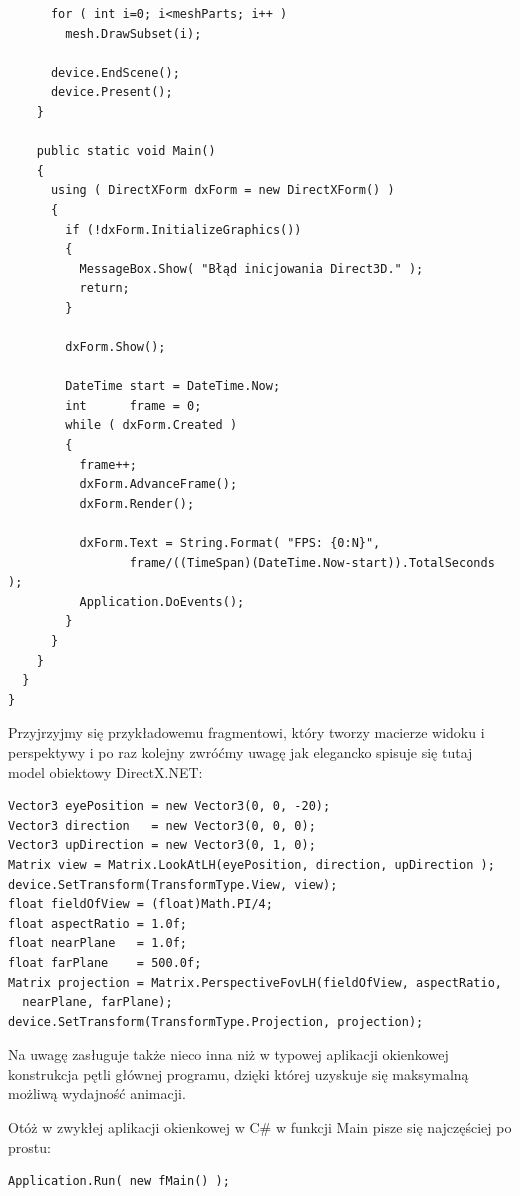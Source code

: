 \begin{scriptsize}
\begin{verbatim}
      for ( int i=0; i<meshParts; i++ )
        mesh.DrawSubset(i);

      device.EndScene();
      device.Present();
    }

    public static void Main() 
    {
      using ( DirectXForm dxForm = new DirectXForm() )
      {
        if (!dxForm.InitializeGraphics()) 
        {
          MessageBox.Show( "Błąd inicjowania Direct3D." );
          return;
        }
			
        dxForm.Show();

        DateTime start = DateTime.Now;
        int      frame = 0;
        while ( dxForm.Created )
        {
          frame++;
          dxForm.AdvanceFrame();
          dxForm.Render();

          dxForm.Text = String.Format( "FPS: {0:N}", 
	             frame/((TimeSpan)(DateTime.Now-start)).TotalSeconds );
          Application.DoEvents();
        }
      }
    }
  }
}
\end{verbatim}
\end{scriptsize}
 
Przyjrzyjmy się przykładowemu fragmentowi, który tworzy macierze widoku i perspektywy i po 
raz kolejny zwróćmy uwagę jak elegancko spisuje się tutaj model obiektowy DirectX.NET:

\begin{scriptsize}
\begin{verbatim}
Vector3 eyePosition = new Vector3(0, 0, -20);
Vector3 direction   = new Vector3(0, 0, 0);
Vector3 upDirection = new Vector3(0, 1, 0);
Matrix view = Matrix.LookAtLH(eyePosition, direction, upDirection );
device.SetTransform(TransformType.View, view);
float fieldOfView = (float)Math.PI/4;
float aspectRatio = 1.0f;
float nearPlane   = 1.0f;
float farPlane    = 500.0f;
Matrix projection = Matrix.PerspectiveFovLH(fieldOfView, aspectRatio, 
  nearPlane, farPlane);
device.SetTransform(TransformType.Projection, projection);
\end{verbatim}
\end{scriptsize}

Na uwagę zasługuje także nieco inna niż w typowej aplikacji okienkowej konstrukcja pętli głównej programu, 
dzięki której uzyskuje się maksymalną możliwą wydajność animacji. 

Otóż w zwykłej aplikacji okienkowej w C\# w funkcji Main pisze się najczęściej po prostu:

\begin{scriptsize}
\begin{verbatim}
Application.Run( new fMain() );
\end{verbatim}
\end{scriptsize}

